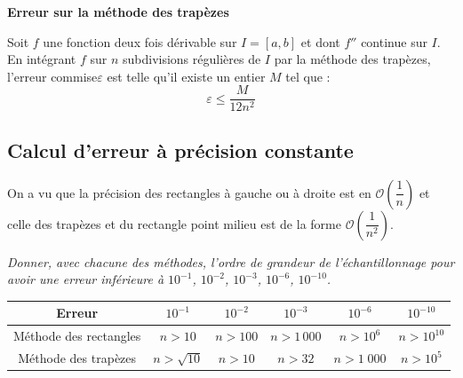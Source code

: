 \documentclass[10pt,fleqn]{article} %
\begin{document}
\begin{resultat}
\textbf{Erreur sur la méthode des trapèzes}

Soit $f$ une fonction deux fois dérivable sur $I=[a,b]$ et dont $f''$ continue sur $I$. %
En intégrant $f$ sur $n$ subdivisions régulières de $I$ par la méthode des trapèzes, l'erreur commise$\varepsilon$ est telle qu'il existe un entier $M$ tel que : 
$$ \varepsilon \leq \dfrac{M}{12n^2}$$ 

\end{resultat}

\subsection{Calcul d'erreur à précision constante}

On a vu que la précision des rectangles à gauche ou à droite est en $\mathcal{O}\left(\dfrac{1}{n}\right)$ et celle des trapèzes et du rectangle point milieu est de la forme $\mathcal{O}\left(\dfrac{1}{n^2}\right)$.

\begin{exemple}
\textit{Donner, avec chacune des méthodes, l'ordre de grandeur de l'échantillonnage pour avoir une erreur inférieure à $10^{-1}$, $10^{-2}$, $10^{-3}$, $10^{-6}$, $10^{-10}$. }
\begin{center}
\begin{tabular}{|c|c|c|c|c|c|}
\hline
Erreur & $10^{-1}$ & $10^{-2}$ & $10^{-3}$ & $10^{-6}$ & $10^{-10}$ \\
\hline
\hline
Méthode des rectangles & $n>10$ & $n>100$ & $n>1\,000$ & $n>10^6$ & $n>10^{10}$  \\
\hline
Méthode des trapèzes & $n>\sqrt{10}$ & $n>10$ & $n>32$ & $n>1\;000$ & $n>10^5$ \\
\hline
\end{tabular}
\end{center}
\end{exemple}
 

\begin{thebibliography}{2}
\end{thebibliography}
\end{document}
